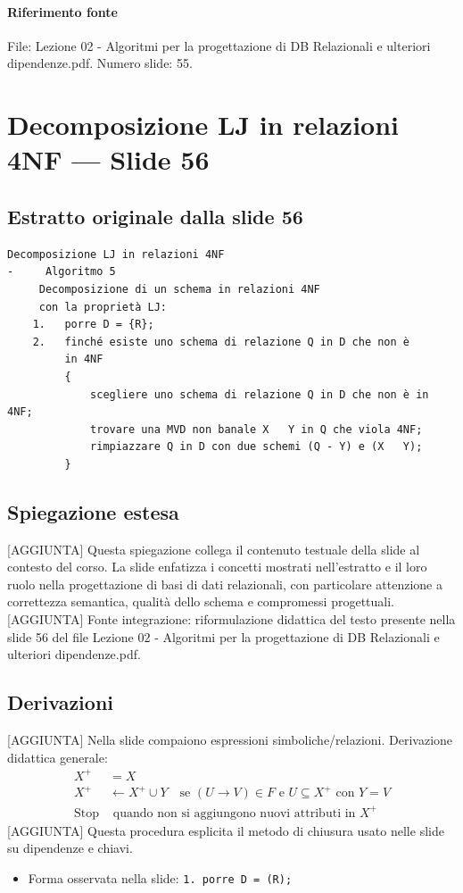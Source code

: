 \documentclass[11pt]{article}
\begin{document}
\paragraph{Riferimento fonte} File: Lezione 02 - Algoritmi per la progettazione di DB Relazionali e ulteriori dipendenze.pdf. Numero slide: 55.
\section{Decomposizione LJ in relazioni 4NF --- Slide 56}
\subsection*{Estratto originale dalla slide 56}
\begin{lstlisting}
Decomposizione LJ in relazioni 4NF
-     Algoritmo 5
     Decomposizione di un schema in relazioni 4NF
     con la proprietà LJ:
    1.   porre D = {R};
    2.   finché esiste uno schema di relazione Q in D che non è
         in 4NF
         {
             scegliere uno schema di relazione Q in D che non è in 4NF;
             trovare una MVD non banale X   Y in Q che viola 4NF;
             rimpiazzare Q in D con due schemi (Q - Y) e (X   Y);
         }
\end{lstlisting}
\subsection*{Spiegazione estesa}
[AGGIUNTA] Questa spiegazione collega il contenuto testuale della slide al contesto del corso. La slide enfatizza i concetti mostrati nell'estratto e il loro ruolo nella progettazione di basi di dati relazionali, con particolare attenzione a correttezza semantica, qualità dello schema e compromessi progettuali.
[AGGIUNTA] Fonte integrazione: riformulazione didattica del testo presente nella slide 56 del file Lezione 02 - Algoritmi per la progettazione di DB Relazionali e ulteriori dipendenze.pdf.
\subsection*{Derivazioni}
[AGGIUNTA] Nella slide compaiono espressioni simboliche/relazioni. Derivazione didattica generale:
\begin{align*}
X^+ &= X \\
X^+ &\leftarrow X^+ \cup Y \quad \text{se } (U \to V) \in F \text{ e } U \subseteq X^+ \text{ con } Y=V \\
\text{Stop} &\text{ quando non si aggiungono nuovi attributi in } X^+
\end{align*}
[AGGIUNTA] Questa procedura esplicita il metodo di chiusura usato nelle slide su dipendenze e chiavi.
\begin{itemize}[leftmargin=*]
\item Forma osservata nella slide: \texttt{1.   porre D = (R);}
\end{itemize}
\end{document}
